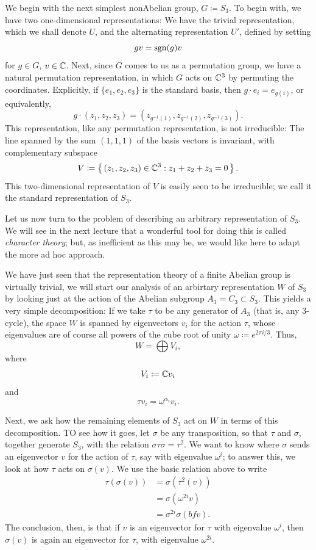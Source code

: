 We begin with the next simplest nonAbelian group, $G\coloneq S_3$. To
begin with, we have two one-dimensional representations: We have the
trivial representation, which we shall denote $U$, and the alternating
representation $U'$, defined by setting
\[
gv=\operatorname{sgn}(g)v
\]
for $g\in G$, $v\in\mathbb{C}$. Next, since $G$ comes to us as a permutation
group, we have a natural permutation representation, in which $G$ acts on
$\mathbb{C}^3$ by permuting the coordinates. Explicitly, if
$\{e_1,e_2,e_3\}$ is the standard basis, then
$g\cdot e_i=e_{g(i)}$, or equivalently,
\[
g\cdot (z_1,z_2,z_3)=\left(z_{g^{-1}(1)},z_{g^{-1}(2)},z_{g^{-1}(3)}\right).
\]
This representation, like any permutation representation, is not
irreducible: The line spanned by the sum $(1,1,1)$ of the basis vectors is
invariant, with complementary subspace
\[
V\coloneq\left\{\,(z_1,z_2,z_3)\in\mathbb{C}^3:z_1+z_2+z_3=0\,\right\}.
\]
This two-dimensional representation of $V$ is easily seen to be
irreducible; we call it the standard representation of $S_3$.

Let us now turn to the problem of describing an arbitrary representation of
$S_3$. We will see in the next lecture that a wonderful tool for doing this
is called \emph{character theory}; but, as inefficient as this may be, we
would like here to adapt the more ad hoc approach.

We have just seen that the representation theory of a finite Abelian group
is virtually trivial, we will start our analysis of an arbirtary
representation $W$ of $S_3$ by looking just at the action of the Abelian
subgroup $A_3=C_3\subset S_3$. This yields a very simple decomposition: If
we take $\tau$ to be any generator of $A_3$ (that is, any $3$-cycle), the
space $W$ is spanned by eigenvectors $v_i$ for the action $\tau$, whose
eigenvalues are of course all powers of the cube root of unity
$\omega\coloneq e^{2\pi i/3}$. Thus,
\[
W=\bigoplus V_i,
\]
where
\[
V_i\coloneq\mathbb{C} v_i
\]
and
\[
\tau v_i=\omega^{\alpha_i}v_i.
\]

Next, we ask how the remaining elements of $S_3$ act on $W$ in terms of
this decomposition. TO see how it goes, let $\sigma$ be any transposition,
so that $\tau$ and $\sigma$, together generate $S_3$, with the relation
$\sigma\tau\sigma=\tau^2$. We want to know where $\sigma$ sends an
eigenvector $v$ for the action of $\tau$, say with eigenvalue
$\omega^i$; to answer this, we look at how $\tau$ acts on
$\sigma(v)$. We use the basic relation above to write
\[
  \begin{aligned}
    \tau(\sigma(v))
    &=\sigma(\tau^2(v))\\
    &=\sigma(\omega^{2i}v)\\
    &=\sigma^{2i}\sigma(bfv).
  \end{aligned}
\]
The conclusion, then, is that if $v$ is an eigenvector for $\tau$ with
eigenvalue $\omega^i$, then $\sigma(v)$ is again an eigenvector for
$\tau$, with eigenvalue $\omega^{2i}$.


